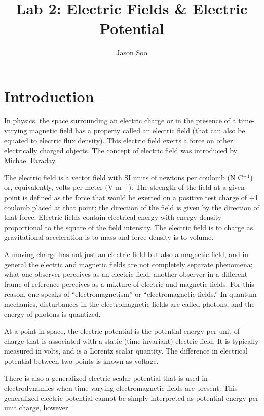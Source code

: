 \documentclass[twocolumn]{article}
\title{Lab 2: Electric Fields \& Electric Potential}
\author{Jason Soo}
\begin{document}
\maketitle
\section{Introduction} %
\label{sec:introduction}

In physics, the space surrounding an electric charge or in the presence of a time-varying magnetic field has a property called an electric field (that can also be equated to electric flux density). This electric field exerts a force on other electrically charged objects. The concept of electric field was introduced by Michael Faraday.

The electric field is a vector field with SI units of newtons per coulomb (N C$^-$$^1$) or, equivalently, volts per meter (V m$^-$$^1$). The strength of the field at a given point is defined as the force that would be exerted on a positive test charge of +1 coulomb placed at that point; the direction of the field is given by the direction of that force. Electric fields contain electrical energy with energy density proportional to the square of the field intensity. The electric field is to charge as gravitational acceleration is to mass and force density is to volume.

A moving charge has not just an electric field but also a magnetic field, and in general the electric and magnetic fields are not completely separate phenomena; what one observer perceives as an electric field, another observer in a different frame of reference perceives as a mixture of electric and magnetic fields. For this reason, one speaks of ``electromagnetism'' or ``electromagnetic fields.'' In quantum mechanics, disturbances in the electromagnetic fields are called photons, and the energy of photons is quantized.

At a point in space, the electric potential is the potential energy per unit of charge that is associated with a static (time-invariant) electric field. It is typically measured in volts, and is a Lorentz scalar quantity. The difference in electrical potential between two points is known as voltage.

There is also a generalized electric scalar potential that is used in electrodynamics when time-varying electromagnetic fields are present. This generalized electric potential cannot be simply interpreted as potential energy per unit charge, however.
\end{document}
